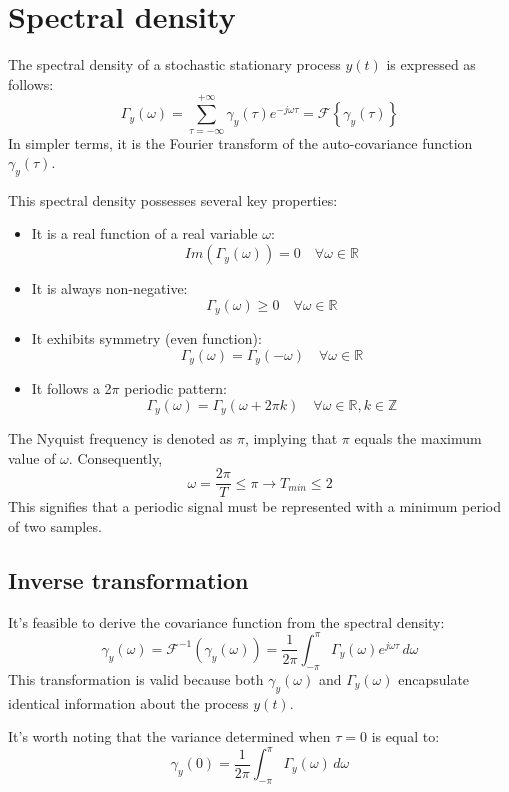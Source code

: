 \section{Spectral density}

The spectral density of a stochastic stationary process $y(t)$ is expressed as follows:
\[\Gamma_y(\omega)=\sum_{\tau=-\infty}^{+\infty}\gamma_y(\tau)e^{-j\omega\tau}=\mathcal{F}\left\{ \gamma_y(\tau) \right\}\]
In simpler terms, it is the Fourier transform of the auto-covariance function $\gamma_y(\tau)$.

This spectral density possesses several key properties:
\begin{itemize}
    \item It is a real function of a real variable $\omega$:
        \[Im(\Gamma_y(\omega))=0\quad\forall\omega\in\mathbb{R}\]
    \item It is always non-negative:
        \[\Gamma_y(\omega) \geq 0\quad\forall\omega\in\mathbb{R}\]
    \item It exhibits symmetry (even function):
        \[\Gamma_y(\omega)=\Gamma_y(-\omega)\quad\forall\omega\in\mathbb{R}\] 
    \item It follows a 2$\pi$ periodic pattern: 
        \[\Gamma_y(\omega)=\Gamma_y(\omega+2\pi k)\quad\forall\omega\in\mathbb{R},k\in\mathbb{Z}\]
\end{itemize}
The Nyquist frequency is denoted as $\pi$, implying that $\pi$ equals the maximum value of $\omega$. 
Consequently,
\[\omega=\dfrac{2\pi}{T} \leq \pi \rightarrow T_{min}\leq 2\]
This signifies that a periodic signal must be represented with a minimum period of two samples.

\subsection{Inverse transformation}
It's feasible to derive the covariance function from the spectral density:
\[\gamma_y(\omega)=\mathcal{F}^{-1}\left(\gamma_y(\omega)\right)=\dfrac{1}{2\pi}\int_{-\pi}^{\pi}\Gamma_y(\omega)e^{j\omega\tau}\,d\omega\]
This transformation is valid because both $\gamma_y(\omega)$ and $\Gamma_y(\omega)$ encapsulate identical information about the process $y(t)$.

It's worth noting that the variance determined when $\tau=0$ is equal to:
\[\gamma_y(0)=\dfrac{1}{2\pi}\int_{-\pi}^{\pi}\Gamma_y(\omega)\,d\omega\]